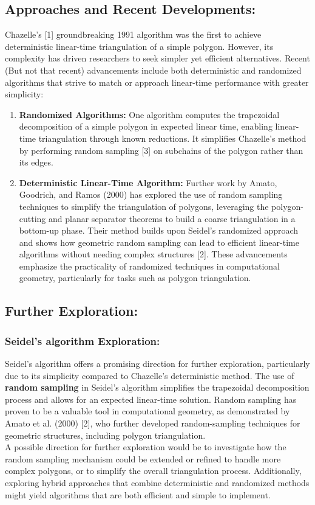 \documentclass{article}
\begin{document}
\subsection*{Approaches and Recent Developments:}
Chazelle's [1] groundbreaking 1991 algorithm was the first to achieve deterministic linear-time triangulation of a simple polygon. However, its complexity has driven researchers to seek simpler yet efficient alternatives. Recent (But not that recent) advancements include both deterministic and randomized algorithms that strive to match or approach linear-time performance with greater simplicity:
\begin{enumerate}
    \item \textbf{Randomized Algorithms: }
    One algorithm computes the trapezoidal decomposition of a simple polygon in expected linear time, enabling linear-time triangulation through known reductions. It simplifies Chazelle's method by performing random sampling [3] on subchains of the polygon rather than its edges. 
    \item \textbf{Deterministic Linear-Time Algorithm: }
    Further work by Amato, Goodrich, and Ramos (2000) has explored the use of random sampling techniques to simplify the triangulation of polygons, leveraging the polygon-cutting and planar separator theorems to build a coarse triangulation in a bottom-up phase. Their method builds upon Seidel's randomized approach and shows how geometric random sampling can lead to efficient linear-time algorithms without needing complex structures [2]. 
    These advancements emphasize the practicality of randomized techniques in computational geometry, particularly for tasks such as polygon triangulation.
\end{enumerate}

\subsection*{Further Exploration: }

\subsubsection*{Seidel's algorithm Exploration: }
Seidel's algorithm offers a promising direction for further exploration, particularly due to its simplicity compared to Chazelle's deterministic method. The use of \textbf{random sampling} in Seidel’s algorithm simplifies the trapezoidal decomposition process and allows for an expected linear-time solution. Random sampling has proven to be a valuable tool in computational geometry, as demonstrated by Amato et al. (2000) [2], who further developed random-sampling techniques for geometric structures, including polygon triangulation.
\\
A possible direction for further exploration would be to investigate how the random sampling mechanism could be extended or refined to handle more complex polygons, or to simplify the overall triangulation process. Additionally, exploring hybrid approaches that combine deterministic and randomized methods might yield algorithms that are both efficient and simple to implement.
\end{document}
